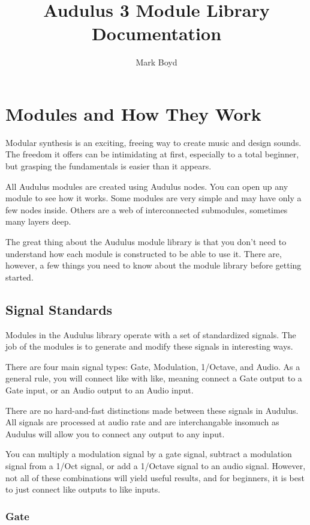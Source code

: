 \documentclass[11pt]{book}
\title{Audulus 3 Module Library Documentation}
\author{Mark Boyd}
\begin{document}
\maketitle

\tableofcontents

\chapter{Modules and How They Work}

Modular synthesis is an exciting, freeing way to create music and design sounds. The freedom it offers can be intimidating at first, especially to a total beginner, but grasping the fundamentals is easier than it appears.

All Audulus modules are created using Audulus nodes. You can open up any module to see how it works. Some modules are very simple and may have only a few nodes inside. Others are a web of interconnected submodules, sometimes many layers deep.

The great thing about the Audulus module library is that you don't need to understand how each module is constructed to be able to use it. There are, however, a few things you need to know about the module library before getting started.

\section{Signal Standards}

Modules in the Audulus library operate with a set of standardized signals. The job of the modules is to generate and modify these signals in interesting ways.

There are four main signal types: Gate, Modulation, 1/Octave, and Audio. As a general rule, you will connect like with like, meaning connect a Gate output to a Gate input, or an Audio output to an Audio input.

There are no hard-and-fast distinctions made between these signals in Audulus. All signals are processed at audio rate and are interchangable insomuch as Audulus will allow you to connect any output to any input.

You can multiply a modulation signal by a gate signal, subtract a modulation signal from a 1/Oct signal, or add a 1/Octave signal to an audio signal. However, not all of these combinations will yield useful results, and for beginners, it is best to just connect like outputs to like inputs.

\subsection{Gate}
\end{document}
